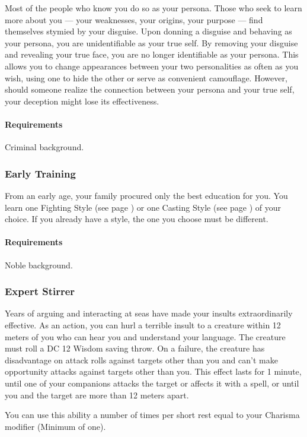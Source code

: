     Most of the people who know you do so as your persona.
    Those who seek to learn more about you --- your weaknesses, your origins, your purpose --- find themselves stymied by your disguise.
    Upon donning a disguise and behaving as your persona, you are unidentifiable as your true self.
    By removing your disguise and revealing your true face, you are no longer identifiable as your persona.
    This allows you to change appearances between your two personalities as often as you wish, using one to hide the other or serve as convenient camouflage.
    However, should someone realize the connection between your persona and your true self, your deception might lose its effectiveness.
    \paragraph{Requirements} Criminal background.
\subsubsection{Early Training} \label{feat::earlytraining}
    From an early age, your family procured only the best education for you.
    You learn one Fighting Style (see page \pageref{ssec::fightingstyles}) or one Casting Style (see page \pageref{ssec::castingstyle}) of your choice.
    If you already have a style, the one you choose must be different.
    \paragraph{Requirements} Noble background.
\subsubsection{Expert Stirrer} \label{feat::expertstirrer}
    Years of arguing and interacting at seas have made your insults extraordinarily effective.
    As an action, you can hurl a terrible insult to a creature within 12 meters of you who can hear you and understand your language.
    The creature must roll a DC 12 Wisdom saving throw.
    On a failure, the creature has disadvantage on attack rolls against targets other than you and can't make opportunity attacks against targets other than you.
    This effect lasts for 1 minute, until one of your companions attacks the target or affects it with a spell, or until you and the target are more than 12 meters apart.

    You can use this ability a number of times per short rest equal to your Charisma modifier (Minimum of one).

